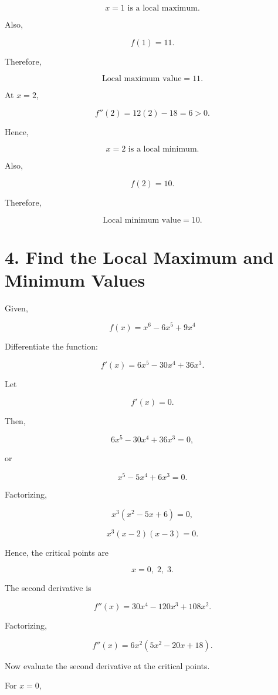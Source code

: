 \documentclass{article}
\begin{document}
\[
\boxed{x=1 \text{ is a local maximum}.}
\]

Also,

\[
f(1)=11.
\]

Therefore,

\[
\boxed{\text{Local maximum value}=11.}
\]

\vspace{0.5cm}

At $x=2$,

\[
f''(2)=12(2)-18=6>0.
\]

Hence,

\[
\boxed{x=2 \text{ is a local minimum}.}
\]

Also,

\[
f(2)=10.
\]

Therefore,

\[
\boxed{\text{Local minimum value}=10.}
\]

\hrulefill

\section*{4. Find the Local Maximum and Minimum Values}

Given,

\[
f(x)=x^6-6x^5+9x^4
\]

Differentiate the function:

\[
f'(x)=6x^5-30x^4+36x^3.
\]

Let

\[
f'(x)=0.
\]

Then,

\[
6x^5-30x^4+36x^3=0,
\]

or

\[
x^5-5x^4+6x^3=0.
\]

Factorizing,

\[
x^3(x^2-5x+6)=0,
\]

\[
x^3(x-2)(x-3)=0.
\]

Hence, the critical points are

\[
\boxed{x=0,\;2,\;3.}
\]

\vspace{0.5cm}

The second derivative is

\[
f''(x)=30x^4-120x^3+108x^2.
\]

Factorizing,

\[
f''(x)=6x^2(5x^2-20x+18).
\]

Now evaluate the second derivative at the critical points.

For \(x=0\),
\end{document}
